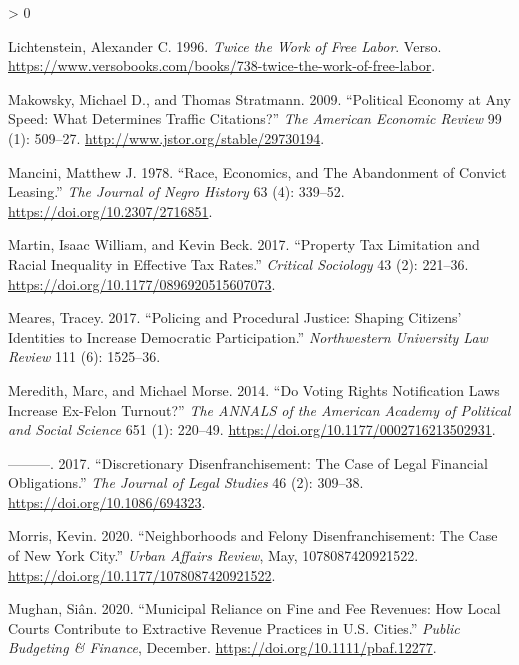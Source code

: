 \documentclass[
  12pt,
]{article}
\newlength{\cslhangindent}
\newenvironment{CSLReferences}[2] %
 {%
  \setlength{\parindent}{0pt}
  \ifodd #1 \everypar{\setlength{\hangindent}{\cslhangindent}}\ignorespaces\fi
  \ifnum #2 > 0
  \setlength{\parskip}{#2\baselineskip}
  \fi
 }%
 {}
\begin{document}
\begin{CSLReferences}{1}{0}
\leavevmode\hypertarget{ref-Lichtenstein1996}{}%
Lichtenstein, Alexander C. 1996. \emph{Twice the {Work} of {Free Labor}}. {Verso}. \url{https://www.versobooks.com/books/738-twice-the-work-of-free-labor}.

\leavevmode\hypertarget{ref-Makowsky2009}{}%
Makowsky, Michael D., and Thomas Stratmann. 2009. {``Political {Economy} at {Any Speed}: {What Determines Traffic Citations}?''} \emph{The American Economic Review} 99 (1): 509--27. \url{http://www.jstor.org/stable/29730194}.

\leavevmode\hypertarget{ref-Mancini1978}{}%
Mancini, Matthew J. 1978. {``Race, {Economics}, and {The Abandonment} of {Convict Leasing}.''} \emph{The Journal of Negro History} 63 (4): 339--52. \url{https://doi.org/10.2307/2716851}.

\leavevmode\hypertarget{ref-Martin2017}{}%
Martin, Isaac William, and Kevin Beck. 2017. {``Property {Tax Limitation} and {Racial Inequality} in {Effective Tax Rates}.''} \emph{Critical Sociology} 43 (2): 221--36. \url{https://doi.org/10.1177/0896920515607073}.

\leavevmode\hypertarget{ref-Meares2017}{}%
Meares, Tracey. 2017. {``Policing and {Procedural Justice}: {Shaping Citizens}' {Identities} to {Increase Democratic Participation}.''} \emph{Northwestern University Law Review} 111 (6): 1525--36.

\leavevmode\hypertarget{ref-Meredith2014}{}%
Meredith, Marc, and Michael Morse. 2014. {``Do {Voting Rights Notification Laws Increase Ex}-{Felon Turnout}?''} \emph{The ANNALS of the American Academy of Political and Social Science} 651 (1): 220--49. \url{https://doi.org/10.1177/0002716213502931}.

\leavevmode\hypertarget{ref-Meredith2017}{}%
---------. 2017. {``Discretionary {Disenfranchisement}: {The Case} of {Legal Financial Obligations}.''} \emph{The Journal of Legal Studies} 46 (2): 309--38. \url{https://doi.org/10.1086/694323}.

\leavevmode\hypertarget{ref-Morris2020}{}%
Morris, Kevin. 2020. {``Neighborhoods and {Felony Disenfranchisement}: {The Case} of {New York City}.''} \emph{Urban Affairs Review}, May, 1078087420921522. \url{https://doi.org/10.1177/1078087420921522}.

\leavevmode\hypertarget{ref-Mughan2020}{}%
Mughan, Siân. 2020. {``Municipal {Reliance} on {Fine} and {Fee Revenues}: {How Local Courts Contribute} to {Extractive Revenue Practices} in {U}.{S}. {Cities}.''} \emph{Public Budgeting \& Finance}, December. \url{https://doi.org/10.1111/pbaf.12277}.


\end{CSLReferences}
\end{document}
